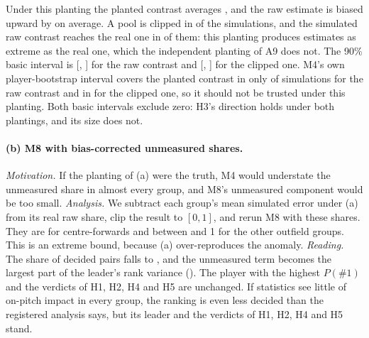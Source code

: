 \documentclass[11pt,a4paper]{article}
\begin{document}
Under this planting the planted contrast averages \AssortPlanted{}, and the
raw estimate is biased upward by \AssortMeanErrorRaw{} on average. A pool is
clipped in \AssortSimClipped{} of the simulations, and the simulated raw
contrast reaches the real one in \AssortSimReachReal{} of them: this planting
produces estimates as extreme as the real one, which the independent planting
of A9 does not. The 90\% basic interval is [\AssortRawLo, \AssortRawHi] for
the raw contrast and [\AssortClippedLo, \AssortClippedHi] for the clipped one.
M4's own player-bootstrap interval covers the planted contrast in only
\AssortCoverageRaw{} of simulations for the raw contrast and in
\AssortCoverageClipped{} for the clipped one, so it should not be trusted
under this planting. Both basic intervals exclude zero: H3's direction holds
under both plantings, and its size does not.

\paragraph{(b) M8 with bias-corrected unmeasured shares.}
\emph{Motivation.} If the planting of (a) were the truth, M4 would understate
the unmeasured share in almost every group, and M8's unmeasured component
would be too small. \emph{Analysis.} We subtract each group's mean simulated
error under (a) from its real raw share, clip the result to $[0,1]$, and rerun
M8 with these shares. They are
\BiasShareCF{} for centre-forwards and between \BiasShareOtherLo{} and 1 for the
other outfield groups. This is an extreme bound, because (a) over-reproduces
the anomaly. \emph{Reading.} The share of decided pairs falls to
\BiasSharePairsDecided{}, and the unmeasured term becomes the largest part of
the leader's rank variance (\BiasTopPlayerVarUnm{}). The player with the highest
$P(\#1)$ and the verdicts of H1, H2, H4 and H5 are unchanged. If statistics see
little of on-pitch impact in every group, the ranking is even less decided than
the registered analysis says, but its leader and the verdicts of H1, H2, H4 and H5
stand.
\end{document}
